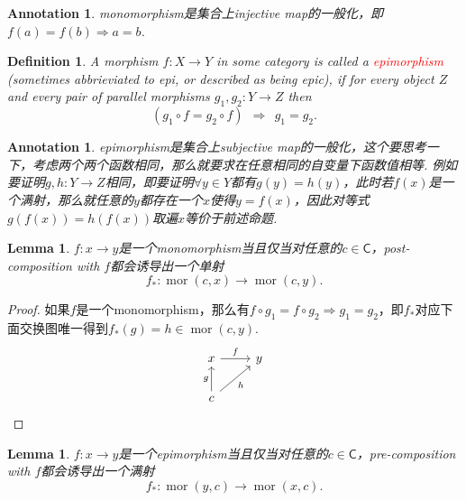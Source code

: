 \documentclass{article}
\newtheorem{lemma}[theorem]{Lemma}
\newtheorem{definition}[theorem]{Definition}
\newtheorem{annotation}[theorem]{Annotation}
\newcommand*{\cat}[1]{\textsf{#1}\xspace}
\newcommand*{\xfunc}[4]{{#2}\colon{#3}{#1}{#4}}
\newcommand*{\func}[3]{\xfunc{\to}{#1}{#2}{#3}}
\DeclareMathOperator{\mor}{mor}
\newcommand{\redt}[1]{\textcolor{red}{#1}}
\begin{document}
\begin{annotation}
\rm monomorphism是集合上injective map的一般化，即$f(a) = f(b) \Rightarrow a = b$. 
\end{annotation}

\begin{definition}
\rm A morphism $\func{f}{X}{Y}$ in some category is called a \redt{epimorphism} (sometimes abbrieviated to epi, or described as being epic), if for every object $Z$ and every pair of parallel morphisms $\func{g_1,g_2}{Y}{Z}$ then
$$
(g_1 \circ f = g_2 \circ f)~~\Rightarrow~~ g_1 = g_2. 
$$
\end{definition}

\begin{annotation}
\rm epimorphism是集合上subjective map的一般化，这个要思考一下，考虑两个两个函数相同，那么就要求在任意相同的自变量下函数值相等. 例如要证明$\func{g,h}{Y}{Z}$相同，即要证明$\forall y \in Y$都有$g(y) = h(y)$，此时若$f(x)$是一个满射，那么就任意的$y$都存在一个$x$使得$y = f(x)$，因此对等式$g(f(x)) = h(f(x))$取遍$x$等价于前述命题.   
\end{annotation}

\begin{lemma}
\rm $\func{f}{x}{y}$是一个monomorphism当且仅当对任意的$c \in \cat{C}$，post-composition with $f$都会诱导出一个单射
$$
\func{f_*}{\mor(c,x)}{\mor(c,y)}.
$$
\end{lemma}

\begin{proof}
\rm 如果$f$是一个monomorphism，那么有$f \circ g_1 = f \circ g_2 \Rightarrow g_1 = g_2$，即$f_*$对应下面交换图唯一得到$f_*(g) = h \in \mor(c,y)$.
$$
\begin{tikzcd}
x \arrow[r, "f"]                      & y \\
c \arrow[u, "g"] \arrow[ru, "h"'] &  
\end{tikzcd}
$$
\end{proof}

\begin{lemma}
\rm $\func{f}{x}{y}$是一个epimorphism当且仅当对任意的$c \in \cat{C}$，pre-composition with $f$都会诱导出一个满射
$$
\func{f_*}{\mor(y,c)}{\mor(x,c)}.
$$
\end{lemma}
\end{document}
